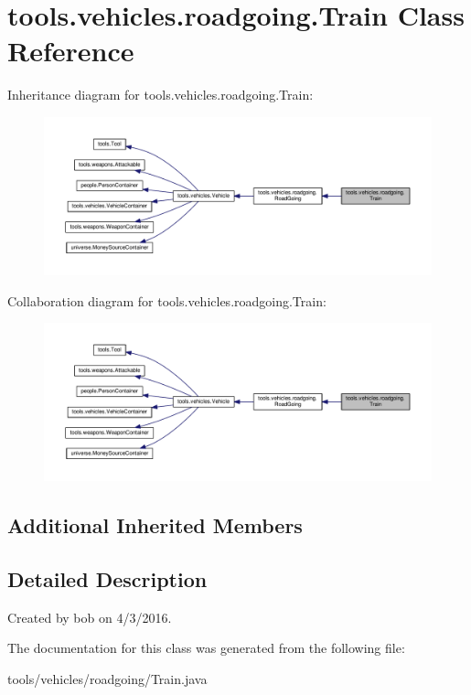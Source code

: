 \hypertarget{classtools_1_1vehicles_1_1roadgoing_1_1_train}{}\section{tools.\+vehicles.\+roadgoing.\+Train Class Reference}
\label{classtools_1_1vehicles_1_1roadgoing_1_1_train}


Inheritance diagram for tools.\+vehicles.\+roadgoing.\+Train\+:\nopagebreak
\begin{figure}[H]
\begin{center}
\leavevmode
\includegraphics[width=350pt]{classtools_1_1vehicles_1_1roadgoing_1_1_train__inherit__graph}
\end{center}
\end{figure}


Collaboration diagram for tools.\+vehicles.\+roadgoing.\+Train\+:\nopagebreak
\begin{figure}[H]
\begin{center}
\leavevmode
\includegraphics[width=350pt]{classtools_1_1vehicles_1_1roadgoing_1_1_train__coll__graph}
\end{center}
\end{figure}
\subsection*{Additional Inherited Members}


\subsection{Detailed Description}
Created by bob on 4/3/2016. 

The documentation for this class was generated from the following file\+:\begin{DoxyCompactItemize}
\item 
tools/vehicles/roadgoing/Train.\+java\end{DoxyCompactItemize}
